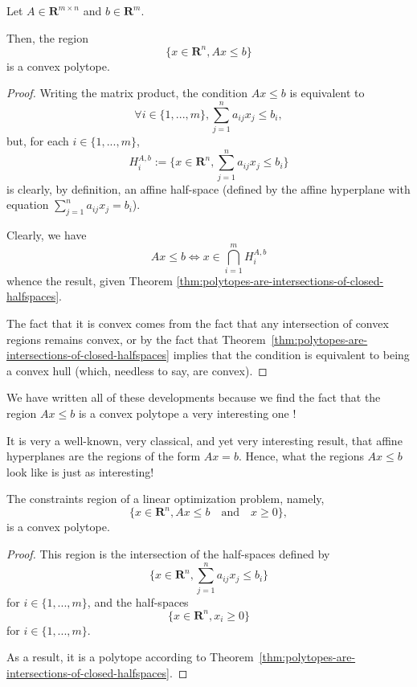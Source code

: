 \begin{theorem}
    Let $ A \in \mathbf R^{m \times n} $ and $ b \in \mathbf R^m $.

    Then, the region
    \[
        \{ x \in \mathbf R^n, Ax \leqslant b \}
    \]
    is a convex polytope.
\end{theorem}

\begin{proof}
    Writing the matrix product, the condition $ Ax \leqslant b $ is equivalent to
    \[
        \forall i \in \{ 1, ..., m \}, \sum_{j=1}^n a_{ij} x_j \leqslant b_i,
    \]
    but, for each $ i \in \{ 1, ..., m \} $,
    \[
        H_i^{A,b} := \{ x \in \mathbf R^n, \sum_{j=1}^n a_{ij} x_j \leqslant b_i \} 
    \]
    is clearly, by definition, an affine half-space (defined by the affine hyperplane with equation $ \sum\limits _{j=1}^na_{ij} x_j = b_i $).

    Clearly, we have
    \[
        Ax \leqslant b \iff x \in \bigcap_{i=1}^m H_i^{A,b}
    \]
    whence the result, given Theorem \ref{thm:polytopes-are-intersections-of-closed-halfspaces}.

    The fact that it is convex comes from the fact that any intersection of convex regions remains convex, or by the fact that Theorem~\ref{thm:polytopes-are-intersections-of-closed-halfspaces} implies that the condition is equivalent to being a convex hull (which, needless to say, are convex).
\end{proof}

\begin{remark}
    We have written all of these developments because we find the fact that the region $ Ax \leqslant b $ is a convex polytope a very interesting one !

    It is very a well-known, very classical, and yet very interesting result, that affine hyperplanes are the regions of the form $ Ax = b $. Hence, what the regions $ Ax \leqslant b $ look like is just as interesting!
\end{remark}

\begin{proposition}
    The constraints region of a linear optimization problem, namely,
    \[
        \{ x \in \mathbf R^n, Ax \leqslant b \quad \textrm{and} \quad x \geqslant 0 \},
    \]
    is a convex polytope.
\end{proposition}

\begin{proof}
    This region is the intersection of the half-spaces defined by
    \[
        \{ x \in \mathbf R^n, \sum_{j=1}^n a_{ij} x_j \leqslant b_i \}
    \]
    for $ i \in \{ 1,...,m \} $, and the half-spaces
    \[
        \{ x \in \mathbf R^n, x_i \geqslant 0 \}
    \]
    for $ i \in \{ 1,...,m \} $.

    As a result, it is a polytope according to Theorem~\ref{thm:polytopes-are-intersections-of-closed-halfspaces}.
\end{proof}


